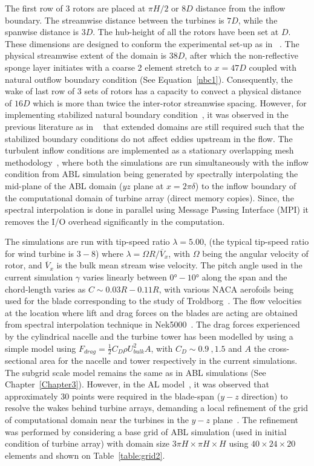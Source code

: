 The first row of 3 rotors are placed at $\pi H/2$ or $8D$ distance from the inflow boundary. The streamwise distance between the turbines is $7D$, while the spanwise distance is $3D$. The hub-height of all the rotors have been set at $D$. These dimensions are designed to conform the experimental set-up as in ~\cite{men2,cal3}. The physical streamwise extent of the domain is $38D$, after which the non-reflective sponge layer initiates with a coarse 2 element stretch to $x = 47D$ coupled with natural outflow boundary condition (See Equation~\ref{nbc1}). Consequently, the wake of last row of 3 sets of rotors has a capacity to convect a physical distance of $16D$ which is more than twice the inter-rotor streamwise spacing. However, for implementing stabilized natural boundary condition~\cite{dong}, it was observed in the previous literature as in ~\cite{erik} that extended domains are still required such that the stabilized boundary conditions do not affect eddies upstream in the flow. The turbulent inflow conditions are implemented as a stationary overlapping mesh methodology~\cite{bem}, where both the simulations are run simultaneously with the inflow condition from ABL simulation being generated by spectrally interpolating the mid-plane of the ABL domain ($yz$ plane at $x = 2\pi\delta$) to the inflow boundary of the computational domain of turbine array (direct memory copies). Since, the spectral interpolation is done in parallel using Message Passing Interface (MPI) it removes the I/O overhead significantly in the computation. \\
\par
The simulations are run with tip-speed ratio $\lambda = 5.00$, (the typical tip-speed ratio for wind turbine is $3-8$) where $\lambda = \Omega R /\overline{V}_x$, with $\Omega$ being the angular velocity of rotor, and $\overline{V}_x$ is the bulk mean stream wise velocity. The pitch angle used in the current simulation $\gamma$ varies linearly between $\ang{0} - \ang{10}$ along the span and the chord-length varies as $C \sim 0.03R - 0.11R$, with various NACA aerofoils being used for the blade corresponding to the study of Troldborg~\cite{troldborg}. The flow velocities at the location where lift and drag forces on the blades are acting are obtained from spectral interpolation technique in Nek5000~\cite{nek5000-web-page}. The drag forces experienced by the cylindrical nacelle and the turbine tower has been modelled by using a simple model using $F_{drag} = \frac{1}{2}C_D \rho U_{bulk}^2 A$, with $C_D \sim 0.9 \ , 1.5$ and $A$ the cross-sectional area for the nacelle and tower respectively in the current simulations. The subgrid scale model remains the same as in ABL simulations (See Chapter~\ref{Chapter3}). However, in the AL model~\cite{troldborg,peet2}, it was observed that approximately 30 points were required in the blade-span ($y-z$ direction) to resolve the wakes behind turbine arrays, demanding a local refinement of the grid of computational domain near the turbines in the $y-z$ plane~\cite{troldborg,churchfield,peet2,tan}. The refinement was performed by considering a base grid of ABL simulation (used in initial condition of turbine array) with domain size $3\pi H \times \pi H \times H$ using $40\times 24\times 20$ elements and shown on Table~\ref{table:grid2}.


